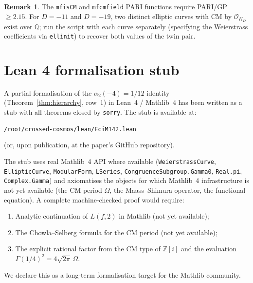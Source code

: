 \documentclass[12pt]{amsart}
\theoremstyle{definition}
\newtheorem{remark}[theorem]{Remark}
\newcommand{\Q}{\mathbb{Q}}
\newcommand{\Z}{\mathbb{Z}}
\newcommand{\OK}{\mathcal{O}_K}
\newcommand{\Omega}{\varOmega}
\begin{document}
\begin{remark}
  The \texttt{mfisCM} and \texttt{mfcmfield} PARI functions require
  PARI/GP $\geq 2.15$.
  For $D = -11$ and $D = -19$, two distinct elliptic curves with CM by
  $\OK_D$ exist over $\Q$; run the script with each curve separately
  (specifying the Weierstrass coefficients via \texttt{ellinit}) to recover
  both values of the twin pair.
\end{remark}

\section{Lean 4 formalisation stub}
\label{sec:lean}

A partial formalisation of the $\alpha_2(-4) = 1/12$ identity
(Theorem~\ref{thm:hierarchy}, row~1) in Lean~4 / Mathlib~4 has been
written as a stub with all theorems closed by \texttt{sorry}.
The stub is available at:
\begin{center}
  \texttt{/root/crossed-cosmos/lean/EciM142.lean}
\end{center}
(or, upon publication, at the paper's GitHub repository).

The stub uses real Mathlib~4 API where available
(\texttt{WeierstrassCurve}, \texttt{EllipticCurve}, \texttt{ModularForm},
\texttt{LSeries}, \texttt{CongruenceSubgroup.Gamma0}, \texttt{Real.pi},
\texttt{Complex.Gamma}) and axiomatises the objects for which Mathlib~4
infrastructure is not yet available (the CM period $\Omega$, the
Maass--Shimura operator, the functional equation).
A complete machine-checked proof would require:
\begin{enumerate}
  \item Analytic continuation of $L(f,2)$ in Mathlib (not yet available);
  \item The Chowla--Selberg formula for the CM period (not yet available);
  \item The explicit rational factor from the CM type of $\Z[i]$
    and the evaluation $\Gamma(1/4)^2 = 4\sqrt{2\pi}\,\Omega$.
\end{enumerate}
We declare this as a long-term formalisation target for the Mathlib community.
\end{document}
